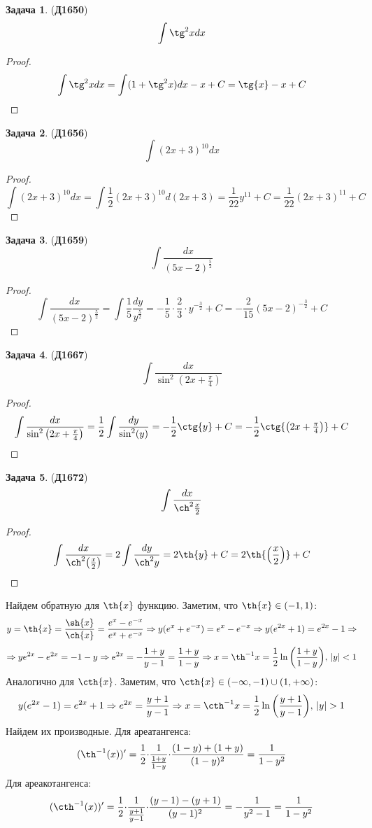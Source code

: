 \documentclass[12pt]{article}
\theoremstyle{definition}
\newtheorem{problem}{Задача}
\DeclareMathOperator{\dint}{\displaystyle\int}
\begin{document}
\begin{problem}(\textbf{Д1650})
	$$
		\dint \tg^2{x}dx
	$$
\end{problem}
\begin{proof}
	$$
		\dint \tg^2{x}dx = \dint (1 + \tg^2{x})dx - x + C = \tg{x} - x + C
	$$
\end{proof}
\newpage
\begin{problem}(\textbf{Д1656})
	$$
		\dint (2x + 3)^{10}dx
	$$
\end{problem}
\begin{proof}
	$$
		\dint (2x + 3)^{10}dx = \dint \dfrac{1}{2}(2x + 3)^{10}d(2x +3) = \dfrac{1}{22}y^{11} + C = \dfrac{1}{22}(2x + 3)^{11} + C
	$$
\end{proof}

\begin{problem}(\textbf{Д1659})
	$$
		\dint \dfrac{dx}{(5x - 2)^{\frac{5}{2}}}
	$$
\end{problem}
\begin{proof}
	$$
		\dint \dfrac{dx}{(5x - 2)^{\frac{5}{2}}} = \dint\dfrac{1}{5}\dfrac{dy}{y^{\frac{5}{2}}} = -\dfrac{1}{5}{\cdot}\dfrac{2}{3}{\cdot}y^{-\frac{3}{2}} + C =-\dfrac{2}{15}(5x - 2)^{-\frac{3}{2}} +C
	$$
\end{proof}

\begin{problem}(\textbf{Д1667})
	$$
		\dint\dfrac{dx}{\sin^2{\left(2x + \tfrac{\pi}{4}\right)}}
	$$
\end{problem}
\begin{proof}
	$$
		\dint\dfrac{dx}{\sin^2{\left(2x + \tfrac{\pi}{4}\right)}} = \dfrac{1}{2}\dint\dfrac{dy}{\sin^2(y)} = -\dfrac{1}{2}\ctg{y} + C = -\dfrac{1}{2}\ctg{\left(2x + \tfrac{\pi}{4}\right)} + C
	$$
\end{proof}
\begin{problem}(\textbf{Д1672})
	$$
		\dint\dfrac{dx}{\ch^2{\frac{x}{2}}}
	$$
\end{problem}
\begin{proof}
	$$
		\dint\dfrac{dx}{\ch^2{\left(\frac{x}{2}\right)}} = 2 \dint \dfrac{dy}{\ch^2{y}} = 2 \th{y} + C = 2\th{\left(\frac{x}{2}\right)} + C
	 $$
\end{proof}

Найдем обратную для $\th{x}$ функцию. Заметим, что $\th{x} \in (-1,1)$:
$$
	y = \th{x} = \dfrac{\sh{x}}{\ch{x}} = \dfrac{e^x - e^{-x}}{e^x + e^{-x}} \Rightarrow y(e^x + e^{-x}) = e^x - e^{-x} \Rightarrow y(e^{2x} + 1) = e^{2x} - 1 \Rightarrow
$$
$$
	\Rightarrow ye^{2x} - e^{2x} = -1 - y \Rightarrow e^{2x} = -\dfrac{1 + y}{y - 1} = \dfrac{1+ y}{1 - y} \Rightarrow  x = \th^{-1}{x}= \dfrac{1}{2}\ln{\left( \dfrac{1 + y}{1-y}\right)}, \, |y| < 1
$$
Аналогично для $\cth{x}$. Заметим, что $\cth{x} \in (-\infty, -1) \cup (1, +\infty)$:
$$
	y(e^{2x} - 1) = e^{2x} + 1 \Rightarrow e^{2x} = \dfrac{y + 1}{y - 1} \Rightarrow x = \cth^{-1}{x} = \dfrac{1}{2}\ln{\left( \dfrac{y + 1}{y - 1}\right)}, \, |y| > 1
$$
\newpage
Найдем их производные. Для ареатангенса:
$$
	(\th^{-1}(x))' = \dfrac{1}{2}{\cdot}\dfrac{1}{\frac{1 +y}{1-y}}{\cdot}\dfrac{(1-y) + (1 + y)}{(1 - y)^2} = \dfrac{1}{1 - y^2}
$$
Для ареакотангенса:
$$
	(\cth^{-1}(x))' = \dfrac{1}{2}{\cdot}\dfrac{1}{\frac{y + 1}{y -1}}{\cdot}\dfrac{(y- 1) - (y + 1)}{(y - 1)^2} = - \dfrac{1}{y^2 - 1} = \dfrac{1}{1 - y^2}
$$
\end{document}
